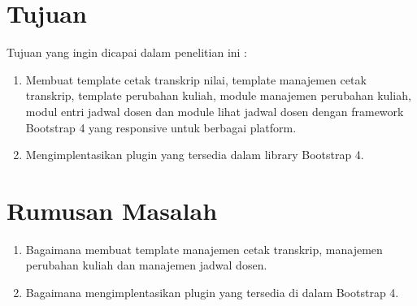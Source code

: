 \documentclass[a4paper,twoside]{article}
\begin{document}
	\section{Tujuan}
	Tujuan yang ingin dicapai dalam penelitian ini :
	\begin{enumerate}
		\item Membuat template cetak transkrip nilai, template manajemen cetak transkrip, template perubahan kuliah, module manajemen perubahan kuliah, modul entri jadwal dosen dan module lihat jadwal dosen dengan framework Bootstrap 4 yang responsive untuk berbagai platform.
		\item Mengimplentasikan plugin yang tersedia dalam library Bootstrap 4.	
	\end{enumerate}
	
	\section{Rumusan Masalah}
	\begin{enumerate}
		\item Bagaimana membuat template manajemen cetak transkrip, manajemen perubahan kuliah dan manajemen jadwal dosen.
		\item Bagaimana mengimplentasikan plugin yang tersedia di dalam Bootstrap 4.	
	\end{enumerate}
	
\end{document}
